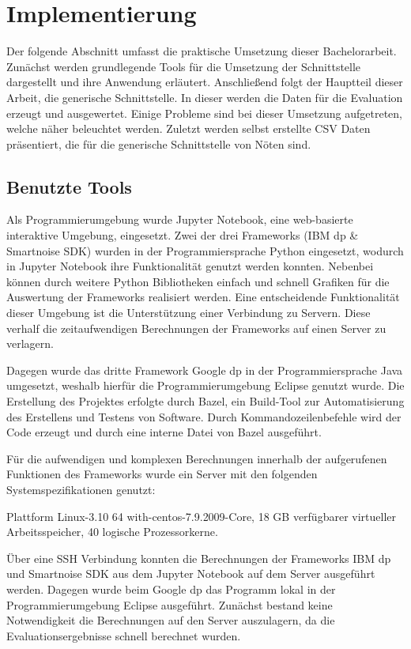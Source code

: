 \chapter{Implementierung}
Der folgende Abschnitt umfasst die praktische Umsetzung dieser Bachelorarbeit. Zunächst werden grundlegende Tools für die Umsetzung der Schnittstelle dargestellt und ihre Anwendung erläutert. Anschließend folgt der Hauptteil dieser Arbeit, die generische Schnittstelle. In dieser werden die Daten für die Evaluation erzeugt und ausgewertet. Einige Probleme sind bei dieser Umsetzung aufgetreten, welche näher beleuchtet werden. Zuletzt werden selbst erstellte CSV Daten präsentiert, die für die generische Schnittstelle von Nöten sind.
\section{Benutzte Tools}
Als Programmierumgebung wurde Jupyter Notebook, eine web-basierte interaktive Umgebung, eingesetzt. Zwei der drei Frameworks (IBM \gls{dp} \& Smartnoise SDK) wurden in der Programmiersprache Python eingesetzt, wodurch in Jupyter Notebook ihre Funktionalität genutzt werden konnten. Nebenbei können durch weitere Python Bibliotheken einfach und schnell Grafiken für die Auswertung der Frameworks realisiert werden. Eine entscheidende Funktionalität dieser Umgebung ist die Unterstützung einer Verbindung zu Servern. Diese verhalf die zeitaufwendigen Berechnungen der Frameworks auf einen Server zu verlagern.

Dagegen wurde das dritte Framework Google \gls{dp} in der Programmiersprache Java umgesetzt, weshalb hierfür die Programmierumgebung Eclipse genutzt wurde. Die Erstellung des Projektes erfolgte durch Bazel, ein Build-Tool zur Automatisierung des Erstellens und Testens von Software. Durch Kommandozeilenbefehle wird der Code erzeugt und durch eine interne Datei von Bazel ausgeführt.

Für die aufwendigen und komplexen Berechnungen innerhalb der aufgerufenen Funktionen des Frameworks wurde ein Server mit den folgenden Systemspezifikationen genutzt: 

Plattform Linux-3.10 64 with-centos-7.9.2009-Core, 18 GB verfügbarer virtueller Arbeitsspeicher, 40 logische Prozessorkerne.

Über eine SSH Verbindung konnten die Berechnungen der Frameworks IBM \gls{dp} und Smartnoise SDK aus dem Jupyter Notebook auf dem Server ausgeführt werden. Dagegen wurde beim Google \gls{dp} das Programm lokal in der Programmierumgebung Eclipse ausgeführt. Zunächst bestand keine Notwendigkeit die Berechnungen auf den Server auszulagern, da die Evaluationsergebnisse schnell berechnet wurden.


